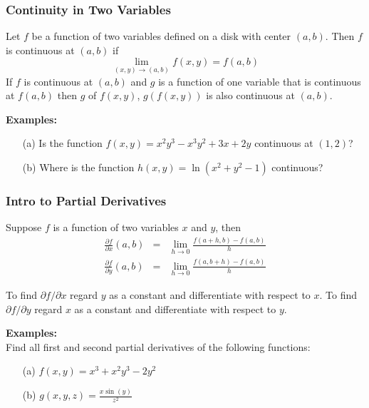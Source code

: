 \documentclass{beamer}
\begin{document}
\begin{frame}
\frametitle{Continuity in Two Variables}
Let $f$ be a function of two variables defined on a disk with center $(a,b)$. Then $f$ is continuous at $(a,b)$ if
$$\lim\limits_{(x,y) \to (a,b)} f(x,y) = f(a,b)$$
If $f$ is continuous at $(a,b)$ and $g$ is a function of one variable that is continuous at $f(a,b)$ then $g$ of $f(x,y)$, $g(f(x,y))$ is also continuous at $(a,b)$.

\vspace{6pt}
\textbf{Examples:}
\begin{itemize}
	\item[(a)] Is the function $f(x,y) = x^2y^3 - x^3y^2 + 3x + 2y$ continuous at $(1,2)$?
	\item[(b)] Where is the function $h(x,y) = \ln (x^2 + y^2 -1)$ continuous?
\end{itemize}
\end{frame}

\begin{frame}
\frametitle{Intro to Partial Derivatives}
Suppose $f$ is a function of two variables $x$ and $y$, then
\begin{eqnarray*}
	\frac{\partial f}{\partial x}(a,b) &=& \lim\limits_{h \to 0} \frac{f(a+h,b)-f(a,b)}{h} \\
	\frac{\partial f}{\partial y}(a,b) &=& \lim\limits_{h \to 0} \frac{f(a,b+h)-f(a,b)}{h}
\end{eqnarray*}

To find $\partial f/ \partial x$ regard $y$ as a constant and differentiate with respect to $x$. To find $\partial f/ \partial y$ regard $x$ as a constant and differentiate with respect to $y$.

\vspace{6pt}
\textbf{Examples:}\\
Find all first and second partial derivatives of the following functions:
\begin{itemize}
	\item[(a)] $f(x,y) = x^3 + x^2y^3 - 2y^2$
	\item[(b)] $g(x,y,z) = \frac{x \sin (y)}{z^2}$
\end{itemize}
\end{frame}
\end{document}
